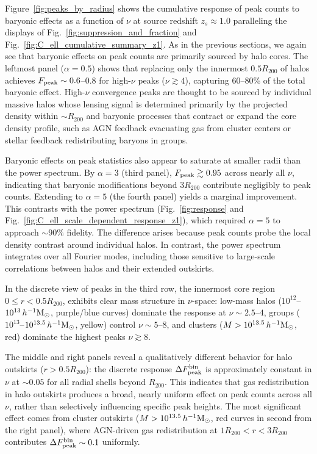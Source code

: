 \documentclass[linenumbers,trackchanges]{aastex701}
\begin{document}
Figure~\ref{fig:peaks_by_radius} shows the cumulative response of peak counts to baryonic effects as a function of $\nu$ at source redshift $z_s \approx 1.0$ paralleling the displays of Fig.~\ref{fig:suppression_and_fraction} and Fig.~\ref{fig:C_ell_cumulative_summary_z1}. As in the previous sections, we again see that baryonic effects on peak counts are primarily sourced by halo cores. The leftmost panel ($\alpha = 0.5$) shows that replacing only the innermost $0.5R_{200}$ of halos achieves $F_{\rm peak} \sim 0.6$–$0.8$ for high-$\nu$ peaks ($\nu \gtrsim 4$), capturing 60–80\% of the total baryonic effect. High-$\nu$ convergence peaks are thought to be sourced by individual massive halos whose lensing signal is determined primarily by the projected density within $\sim R_{200}$ \citep{Yang-13, liu16} and baryonic processes that contract or expand the core density profile, such as AGN feedback evacuating gas from cluster centers or stellar feedback redistributing baryons in groups.

Baryonic effects on peak statistics also appear to saturate at smaller radii than the power spectrum. By $\alpha = 3$ (third panel), $F_{\rm peak} \gtrsim 0.95$ across nearly all $\nu$, indicating that baryonic modifications beyond $3R_{200}$ contribute negligibly to peak counts. Extending to $\alpha = 5$ (the fourth panel) yields a marginal improvement. This contrasts with the power spectrum (Fig.~\ref{fig:response} and Fig.~\ref{fig:C_ell_scale_dependent_response_z1}), which required $\alpha = 5$ to approach $\sim90\%$ fidelity. The difference arises because peak counts probe the local density contrast around individual halos. In contrast, the power spectrum integrates over all Fourier modes, including those sensitive to large-scale correlations between halos and their extended outskirts.

In the discrete view of peaks in the third row, the innermost core region $0 \leq r < 0.5R_{200}$, exhibits clear mass structure in $\nu$-space: low-mass halos ($10^{12}$–$10^{13}\,h^{-1}{\rm M}_\odot$, purple/blue curves) dominate the response at $\nu \sim 2.5$–$4$, groups ($10^{13}$–$10^{13.5}\,h^{-1}{\rm M}_\odot$, yellow) control $\nu \sim 5$–$8$, and clusters ($M > 10^{13.5}\,h^{-1}{\rm M}_\odot$, red) dominate the highest peaks $\nu \gtrsim 8$.

The middle and right panels reveal a qualitatively different behavior for halo outskirts ($r > 0.5R_{200}$): the discrete response $\Delta F_{\rm peak}^{\rm bin}$ is approximately constant in $\nu$ at $\sim 0.05$ for all radial shells beyond $R_{200}$. This indicates that gas redistribution in halo outskirts produces a broad, nearly uniform effect on peak counts across all $\nu$, rather than selectively influencing specific peak heights. The most significant effect comes from cluster outskirts ($M > 10^{13.5}\,h^{-1}{\rm M}_\odot$, red curves in second from the right panel), where AGN-driven gas redistribution at $1R_{200} < r < 3R_{200}$ contributes $\Delta F_{\rm peak}^{\rm bin} \sim 0.1$ uniformly.
\end{document}
